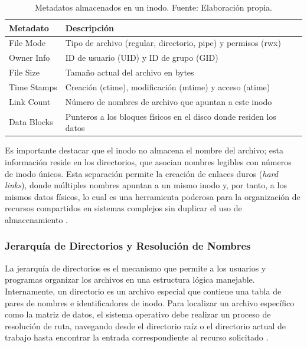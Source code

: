 \begin{table}[H]
\centering
\begin{tabular}{|p{3.5cm}|p{9.5cm}|}
\hline
\textbf{Metadato} & \textbf{Descripción} \\
\hline
File Mode & Tipo de archivo (regular, directorio, pipe) y permisos (rwx) \cite{ieee2017posix} \\
\hline
Owner Info & ID de usuario (UID) y ID de grupo (GID) \cite{glibc_manual} \\
\hline
File Size & Tamaño actual del archivo en bytes \cite{mit_6828} \\
\hline
Time Stamps & Creación (ctime), modificación (mtime) y acceso (atime) \cite{ieee2017posix} \\
\hline
Link Count & Número de nombres de archivo que apuntan a este inodo \cite{berkeley_cs162} \\
\hline
Data Blocks & Punteros a los bloques físicos en el disco donde residen los datos \cite{mit_6828, stanford_cs111} \\
\hline
\end{tabular}
\caption{Metadatos almacenados en un inodo. Fuente: Elaboración propia.}
\label{tab:metadatos_inodo}
\end{table}

Es importante destacar que el inodo no almacena el nombre del archivo; esta información reside en los directorios, que asocian nombres legibles con números de inodo únicos. Esta separación permite la creación de enlaces duros (\textit{hard links}), donde múltiples nombres apuntan a un mismo inodo y, por tanto, a los mismos datos físicos, lo cual es una herramienta poderosa para la organización de recursos compartidos en sistemas complejos sin duplicar el uso de almacenamiento \cite{berkeley_cs162, mit_6828}.

\subsubsection{Jerarquía de Directorios y Resolución de Nombres}

La jerarquía de directorios es el mecanismo que permite a los usuarios y programas organizar los archivos en una estructura lógica manejable. Internamente, un directorio es un archivo especial que contiene una tabla de pares de nombres e identificadores de inodo. Para localizar un archivo específico como la matriz de datos, el sistema operativo debe realizar un proceso de resolución de ruta, navegando desde el directorio raíz o el directorio actual de trabajo hasta encontrar la entrada correspondiente al recurso solicitado \cite{glibc_manual, stanford_cs111}.


